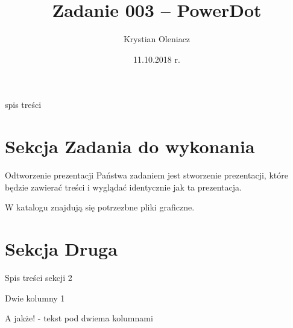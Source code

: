 \documentclass[
  size=14pt,
  mode=present,
  paper=a4paper,
  clock,
  style=sailor
]{powerdot}			%
\title{Zadanie 003 -- PowerDot}
\author{Krystian Oleniacz}
\date{11.10.2018 r.}
\begin{document}
\maketitle

\begin{slide}{spis treści}
	\tableofcontents[content=sections]
\end{slide}

\section[toc={Zadania}]{Sekcja Zadania do wykonania}



\begin{slide}{Odtworzenie prezentacji}
	Państwa zadaniem jest stworzenie prezentacji, które będzie zawierać treści i wyglądać identycznie jak ta prezentacja. \pause
	
	W katalogu znajdują się potrzezbne pliki graficzne.	
\end{slide}


\section{Sekcja Druga}
\begin{slide}{Spis treści sekcji 2}
	\tableofcontents[content=currentsection]
	\end{slide}
\begin{slide}{Dwie kolumny 1}
	
	
	
	
	A jakże! - tekst pod dwiema kolumnami
\end{slide}
\end{document}
